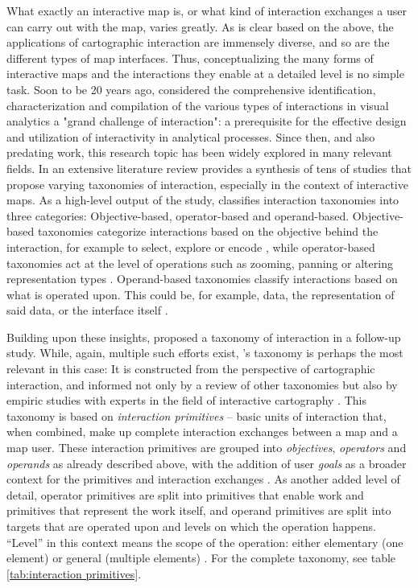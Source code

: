 What exactly an interactive map is,
or what kind of interaction exchanges a user can carry out with the map,
varies greatly.  %
As is clear based on the above,
the applications of cartographic interaction are immensely diverse,
and so are the different types of map interfaces.
Thus, conceptualizing the many forms of
interactive maps and the interactions they enable
at a detailed level is no simple task.
Soon to be 20 years ago,
\textcite{tho2005} considered the comprehensive
identification, characterization and compilation
of the various types of interactions in visual analytics a
"grand challenge of interaction":
a prerequisite for the effective design and utilization of
interactivity in analytical processes.
Since then, and also predating  work,
this research topic has been widely explored in many relevant fields.
In an extensive literature review \textcite{rot2012}
provides a synthesis of tens of studies
that propose varying taxonomies of interaction,
especially in the context of interactive maps.
As a high-level output of the study, \citeauthor{rot2012}
classifies interaction taxonomies into three categories:
Objective-based, operator-based and operand-based.
Objective-based taxonomies categorize interactions based on
the objective behind the interaction,
for example to select, explore or encode \parencite{yi2007},
while operator-based taxonomies act at the level of operations such as
zooming, panning or altering representation types \parencite{eds2008}.
Operand-based taxonomies classify interactions based on what is operated upon.
This could be, for example, data, the representation of said data,
or the interface itself \parencite{cra2002}.

Building upon these insights,
\textcite{rot2013a} proposed a taxonomy of interaction in a follow-up study.
While, again, multiple such efforts exist,
\citeauthor{rot2013a}'s taxonomy is perhaps the most relevant in this case:
It is constructed from the perspective of cartographic interaction,
and informed not only by a review of other taxonomies \parencite{rot2012}
but also by empiric studies with experts in the field of interactive cartography
\parencite{rot2013a}.
This taxonomy is based on \textit{interaction primitives} --
basic units of interaction that, when combined,
make up complete interaction exchanges between a map and a map user.
These interaction primitives are grouped into
\textit{objectives}, \textit{operators} and \textit{operands} as already described above,
with the addition of user \textit{goals} as a broader context for
the primitives and interaction exchanges \parencite{rot2013a}.
As another added level of detail, operator primitives are split into primitives that
enable work and primitives that represent the work itself,
and operand primitives are split into targets that are operated
upon and levels on which the operation happens.
\enquote{Level} in this context means the scope of the operation:
either elementary (one element) or general (multiple elements) \parencite{rot2013a}.
For the complete taxonomy, see table \ref{tab:interaction primitives}.

